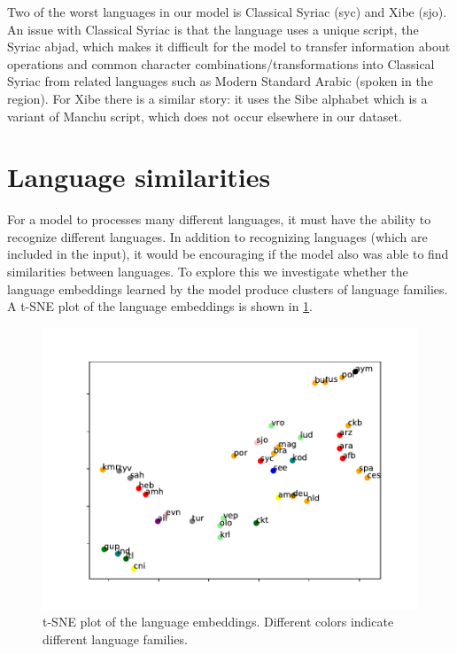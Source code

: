 \documentclass[11pt,a4paper]{article}
\begin{document}
Two of the worst languages in our model is Classical Syriac (syc) and
Xibe (sjo).  An issue with Classical Syriac is that the language uses
a unique script, the Syriac abjad, which makes it difficult for the
model to transfer information about operations and common character
combinations/transformations into Classical Syriac from related
languages such as Modern Standard Arabic (spoken in the region). For
Xibe there is a similar story: it uses the Sibe alphabet which is a
variant of Manchu script, which does not occur elsewhere in our
dataset.



\section{Language similarities}

For a model to processes many different languages, it must have the
ability to recognize different languages.
In addition to recognizing
languages (which are included in the input), it would be encouraging
if the model also was able to find similarities between languages.  To
explore this we investigate whether the language embeddings learned by
the model produce clusters of language families. A t-SNE plot of the
language embeddings is shown in \cref{fig:lang_tsne}.

\begin{figure}[ht]
\centering
\includegraphics[scale=0.5]{lang_tsne.pdf}
\caption{\label{fig:lang_tsne} t-SNE plot of the language
embeddings. Different colors indicate different language families.}
\end{figure}
\end{document}
